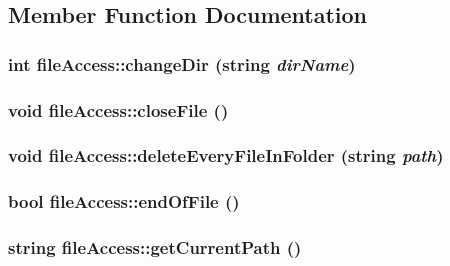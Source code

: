 \subsection{Member Function Documentation}
\hypertarget{classfile_access_a67d1cb63b2ec197b07175984c3cc6419}{
\subsubsection[{changeDir}]{\setlength{\rightskip}{0pt plus 5cm}int fileAccess::changeDir (string {\em dirName})}}
\label{classfile_access_a67d1cb63b2ec197b07175984c3cc6419}
\hypertarget{classfile_access_a60efd458becc18c4a4a71033ac8f2a9c}{
\subsubsection[{closeFile}]{\setlength{\rightskip}{0pt plus 5cm}void fileAccess::closeFile ()}}
\label{classfile_access_a60efd458becc18c4a4a71033ac8f2a9c}
\hypertarget{classfile_access_aca9252b340bdee9f65ea5d6cc35f2a22}{
\subsubsection[{deleteEveryFileInFolder}]{\setlength{\rightskip}{0pt plus 5cm}void fileAccess::deleteEveryFileInFolder (string {\em path})}}
\label{classfile_access_aca9252b340bdee9f65ea5d6cc35f2a22}
\hypertarget{classfile_access_a8a3b856426e1a903beaedf93585578f3}{
\subsubsection[{endOfFile}]{\setlength{\rightskip}{0pt plus 5cm}bool fileAccess::endOfFile ()}}
\label{classfile_access_a8a3b856426e1a903beaedf93585578f3}
\hypertarget{classfile_access_a39b158208424b8cfb167bc93ce30a351}{
\subsubsection[{getCurrentPath}]{\setlength{\rightskip}{0pt plus 5cm}string fileAccess::getCurrentPath ()}}
